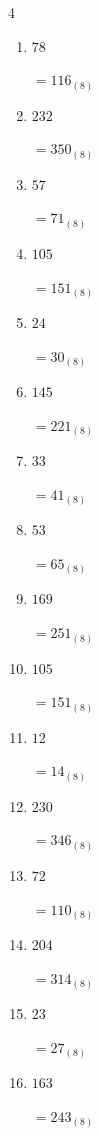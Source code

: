 \begin{multicols}{4}
\begin{enumerate}
        $=51_{(8)}$

  \item $78$

        $=116_{(8)}$

  \item $232$

        $=350_{(8)}$

  \item $57$

        $=71_{(8)}$

  \item $105$

        $=151_{(8)}$

  \item $24$

        $=30_{(8)}$

  \item $145$

        $=221_{(8)}$

  \item $33$

        $=41_{(8)}$

  \item $53$

        $=65_{(8)}$

  \item $169$

        $=251_{(8)}$

  \item $105$

        $=151_{(8)}$

  \item $12$

        $=14_{(8)}$

\columnbreak %

  \item $230$

        $=346_{(8)}$

  \item $72$

        $=110_{(8)}$

  \item $204$

        $=314_{(8)}$

  \item $23$

        $=27_{(8)}$

  \item $163$

        $=243_{(8)}$


\end{enumerate}
\end{multicols}
